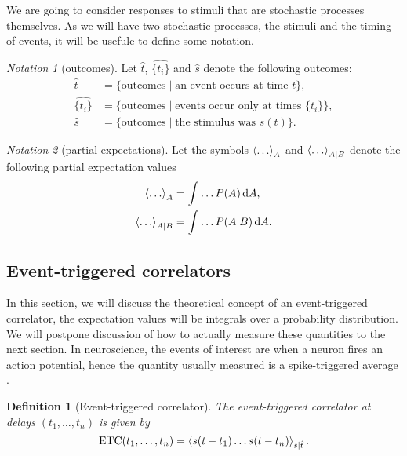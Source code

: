 \documentclass[12pt]{article}
\theoremstyle{slplain}
\theoremstyle{sldefinition}
\newtheorem{defn}{Definition}
\theoremstyle{remark}
\newtheorem*{notn}{Notation}
\DeclareMathOperator{\ETC}{ETC}
\begin{document}
We are going to consider responses to stimuli that are stochastic processes themselves. As we will have two stochastic processes, the stimuli and the timing of events, it will be usefule to define some notation.

\begin{notn}[outcomes]
  Let $\hat{t}$, $\widehat{\{t_i\}}$ and $\hat{s}$ denote the following outcomes:
  \begin{equation}\label{eq:outcomes}
    \begin{aligned}
      \hat{t} &= \{ \text{outcomes} \mid \text{an event occurs at time } t  \} , \\
      \widehat{\{t_i\}} &= \{ \text{outcomes} \mid \text{events occur only at times } \{t_i\}  \} , \\
      \hat{s} &= \{ \text{outcomes} \mid \text{the stimulus was } s(t)  \} .
    \end{aligned}
  \end{equation}
\end{notn}

\begin{notn}[partial expectations]
  Let the symbols $\left\langle \ldots \right\rangle_A$ and $\left\langle \ldots \right\rangle_{A|B}$ denote the following partial expectation values
  \begin{equation}\label{eq:partialexp}
    \begin{aligned}
      \left\langle \ldots \right\rangle_A &= \int\ldots P(A)\,\mathrm{d} A, \\
      \left\langle \ldots \right\rangle_{A|B} &= \int\ldots P(A|B)\,\mathrm{d} A.
    \end{aligned}
  \end{equation}
\end{notn}

\subsection{Event-triggered correlators}\label{sec:evtrigcorr}

In this section, we will discuss the theoretical concept of an event-triggered correlator, \ie the expectation values will be integrals over a probability distribution. We will postpone discussion of how to actually measure these quantities to the next section. In neuroscience, the events of interest are when a neuron fires an action potential, hence the quantity usually measured is a spike-triggered average \cite{DayanAbbot:2001,deBoerKuyper:1968}.

\begin{defn}[Event-triggered correlator]
  The event-triggered correlator at delays $(t_1,\ldots,t_n)$ is given by
  \begin{equation}\label{eq:evtrigcorr}
    \ETC(t_1,\ldots,t_n) = \av{s(t-t_1)\ldots s(t-t_n)}_{\hat{s}|\hat{t}}.
  \end{equation}
\end{defn}
\end{document}
